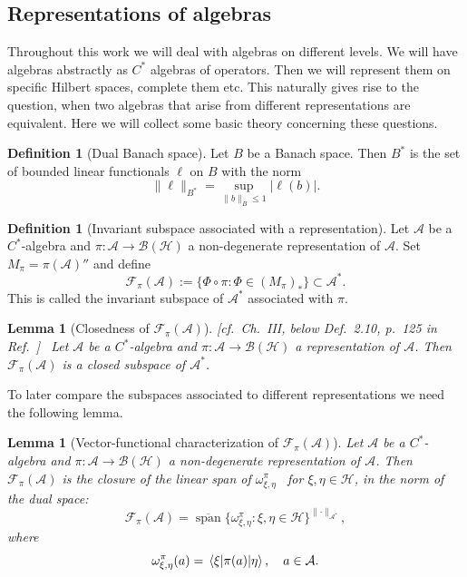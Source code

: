 \documentclass[aps,pra,reprint,superscriptaddress]{revtex4-2}
\newcommand{\cA}{{\mathcal A}}
\newcommand{\cB}{{\mathcal B}}
\newcommand{\cF}{{\mathcal F}}
\newcommand{\cH}{{\mathcal H}}
\renewcommand\P{\Phi}
\providecommand{\abs}[1]{\lvert #1\rvert}
\providecommand{\norm}[1]{\lVert #1\rVert}
\newcommand{\thmref}[1]{\textnormal{[#1]}\ }
\newtheorem{lemma}[theorem]{Lemma}
\theoremstyle{definition}
\newtheorem{definition}[theorem]{Definition}
\theoremstyle{remark}
\begin{document}
\subsection{Representations of algebras}
    Throughout this work we will deal with algebras on different levels. We will have algebras abstractly as $C^\ast$ algebras of operators. Then we will represent them on specific Hilbert spaces, complete them etc. This naturally gives rise to the question, when two algebras that arise from different representations are equivalent. Here we will collect some basic theory concerning these questions.

\begin{definition}[Dual Banach space]
Let $B$ be a Banach space. Then $B^*$ is the set of bounded linear functionals $\ell$
on $B$ with the norm
\begin{equation}
    \norm{\ell}_{B^*}
    =
    \sup_{\norm{b}_B \leq 1} \abs{\ell(b)}.
\end{equation}
\end{definition}

\begin{definition}[Invariant subspace associated with a representation]
Let $\cA$ be a $C^\ast$-algebra and
$\pi:\cA \rightarrow \cB(\cH)$ a non-degenerate representation of $\cA$. Set
$M_\pi = \pi(\cA)''$ and define
\begin{equation}
    \cF_\pi(\cA)
    :=
	    \{\P \circ \pi : \P \in (M_\pi)_*\}
	    \subset \cA^*.
\end{equation}
This is called the invariant subspace of $\cA^*$ associated with $\pi$.
\end{definition}

\begin{lemma}[Closedness of $\cF_\pi(\cA)$]\label{lem:takesaki-folium-closed}
\thmref{cf.~Ch.~III, below Def.~2.10, p.~125 in Ref.~\cite{TakesakiI}}
Let $\cA$ be a $C^\ast$-algebra and
$\pi:\cA \rightarrow \cB(\cH)$ a representation of $\cA$. Then
$\cF_\pi(\cA)$ is a closed subspace of $\cA^*$.
\end{lemma}
To later compare the subspaces associated to different representations we need the following lemma.
\begin{lemma}[Vector-functional characterization of $\cF_\pi(\cA)$]\label{lem:linear-folium}
Let $\cA$ be a $C^\ast$-algebra and
$\pi:\cA \rightarrow \cB(\cH)$ a non-degenerate representation of $\cA$.
Then $\cF_\pi(\cA)$ is the closure of the linear span of
$\omega_{\xi,\eta}^\pi$ ~for $\xi,\eta \in \cH$, in the norm of the dual space:
\begin{equation}
	    \cF_\pi(\cA)
	    =
    \overline{\operatorname{span}}
    \{\omega_{\xi,\eta}^\pi : \xi,\eta \in \cH\}^{\norm{\cdot}_{\cA^*}},
\end{equation}
where
\begin{equation}
	    \omega_{\xi,\eta}^\pi(a) = \mel{\xi}{\pi(a)}{\eta},
	    \quad a \in \cA.
\end{equation}
\end{lemma}
\end{document}
